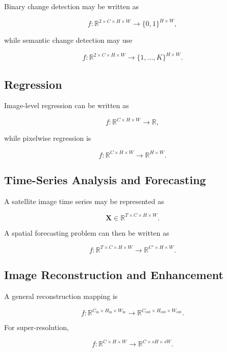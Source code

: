 \documentclass[
    11pt,
    a4paper,
    parskip=half,
    bibliography=totoc,
    numbers=noenddot
]{scrartcl}
\begin{document}
Binary change detection may be written as

\[
f:
\mathbb{R}^{2\times C\times H\times W}
\rightarrow
\{0,1\}^{H\times W},
\]

while semantic change detection may use

\[
f:
\mathbb{R}^{2\times C\times H\times W}
\rightarrow
\{1,\ldots,K\}^{H\times W}.
\]

\subsection{Regression}

Image-level regression can be written as

\[
f:
\mathbb{R}^{C\times H\times W}
\rightarrow
\mathbb{R},
\]

while pixelwise regression is

\[
f:
\mathbb{R}^{C\times H\times W}
\rightarrow
\mathbb{R}^{H\times W}.
\]

\subsection{Time-Series Analysis and Forecasting}

A satellite image time series may be represented as

\[
\mathbf{X}
\in
\mathbb{R}^{T\times C\times H\times W}.
\]

A spatial forecasting problem can then be written as

\[
f:
\mathbb{R}^{T\times C\times H\times W}
\rightarrow
\mathbb{R}^{C'\times H\times W}.
\]

\subsection{Image Reconstruction and Enhancement}

A general reconstruction mapping is

\[
f:
\mathbb{R}^{C_{\mathrm{in}}\times H_{\mathrm{in}}\times W_{\mathrm{in}}}
\rightarrow
\mathbb{R}^{C_{\mathrm{out}}\times H_{\mathrm{out}}\times W_{\mathrm{out}}}.
\]

For super-resolution,

\[
f:
\mathbb{R}^{C\times H\times W}
\rightarrow
\mathbb{R}^{C\times sH\times sW}.
\]

\end{document}
